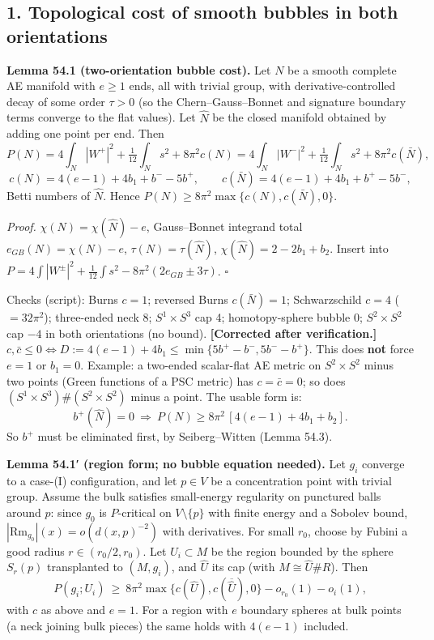 \documentclass[
  10pt,
]{report}
\renewcommand{\backslash}{\mathord{\text{\textbackslash}}}%
\renewcommand{\setminus}{\mathbin{\backslash}}}
\begin{document}
\hypertarget{topological-cost-of-smooth-bubbles-in-both-orientations}{%
\subsection{1. Topological cost of smooth bubbles in both
orientations}\label{topological-cost-of-smooth-bubbles-in-both-orientations}}

\textbf{Lemma 54.1 (two-orientation bubble cost).} Let \(N\) be a smooth
complete AE manifold with \(e\ge1\) ends, all with trivial group, with
derivative-controlled decay of some order \(\tau>0\) (so the
Chern--Gauss--Bonnet and signature boundary terms converge to the flat
values). Let \(\widehat N\) be the closed manifold obtained by adding
one point per end. Then \[
P(N)=4\!\int_N|W^+|^2+\tfrac1{12}\!\int_Ns^2+8\pi^2c(N)=4\!\int_N|W^-|^2+\tfrac1{12}\!\int_Ns^2+8\pi^2c(\bar N),
\] \[
c(N)=4(e-1)+4b_1+b^- -5b^+,\qquad c(\bar N)=4(e-1)+4b_1+b^+-5b^-,
\] Betti numbers of \(\widehat N\). Hence
\(P(N)\ge8\pi^2\max\{c(N),c(\bar N),0\}\).

\emph{Proof.} \(\chi(N)=\chi(\widehat N)-e\), Gauss--Bonnet integrand
total \(e_{GB}(N)=\chi(N)-e\), \(\tau(N)=\tau(\widehat N)\),
\(\chi(\widehat N)=2-2b_1+b_2\). Insert into
\(P=4\int|W^\pm|^2+\frac1{12}\int s^2-8\pi^2(2e_{GB}\pm3\tau)\).
\(\square\)

Checks (script): Burns \(c=1\); reversed Burns \(c(\bar N)=1\);
Schwarzschild \(c=4\) (\(=32\pi^2\)); three-ended neck 8;
\(S^1\times S^3\) cap 4; homotopy-sphere bubble 0; \(S^2\times S^2\) cap
\(-4\) in both orientations (no bound). \textbf{{[}Corrected after
verification.{]}}
\(c,\bar c\le0\iff D:=4(e-1)+4b_1\le\min\{5b^+-b^-,5b^--b^+\}\). This
does \textbf{not} force \(e=1\) or \(b_1=0\). Example: a two-ended
scalar-flat AE metric on \(S^2\times S^2\) minus two points (Green
functions of a PSC metric) has \(c=\bar c=0\); so does
\((S^1\times S^3)\#(S^2\times S^2)\) minus a point. The usable form is:
\[
b^+(\widehat N)=0\ \Longrightarrow\ P(N)\ge8\pi^2\,[4(e-1)+4b_1+b_2].\tag{1}
\] So \(b^+\) must be eliminated first, by Seiberg--Witten (Lemma 54.3).

\textbf{Lemma 54.1′ (region form; no bubble equation needed).} Let
\(g_i\) converge to a case-(I) configuration, and let \(p\in V\) be a
concentration point with trivial group. Assume the bulk satisfies
small-energy regularity on punctured balls around \(p\): since \(g_0\)
is \(P\)-critical on \(V\setminus\{p\}\) with finite energy and a
Sobolev bound, \(|\mathrm{Rm}_{g_0}|(x)=o(d(x,p)^{-2})\) with
derivatives. For small \(r_0\), choose by Fubini a good radius
\(r\in(r_0/2,r_0)\). Let \(U_i\subset M\) be the region bounded by the
sphere \(S_r(p)\) transplanted to \((M,g_i)\), and \(\widehat U\) its
cap (with \(M\cong\widehat U\#R\)). Then \[
P(g_i;U_i)\ \ge\ 8\pi^2\max\{c(\widehat U),c(\overline{\widehat U}),0\}-o_{r_0}(1)-o_i(1),
\] with \(c\) as above and \(e=1\). For a region with \(e\) boundary
spheres at bulk points (a neck joining bulk pieces) the same holds with
\(4(e-1)\) included.
\end{document}
